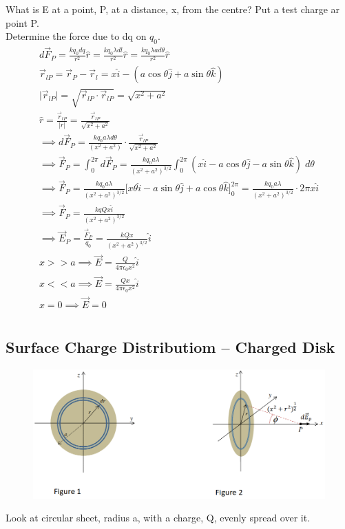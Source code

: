 \documentclass[a4paper, 11pt, fleqn, normalem]{report}
\begin{document}
What is E at a point, P, at a distance, x, from the centre?
Put a test charge ar point P. \\
Determine the force due to dq on $q_{0}$.
\begin{gather*}
    d\vec{F}_{P} = \frac{kq_{0}dq}{r^{2}} \hat{r} = \frac{kq_{0}\lambda dl}{r^{2}} \hat{r} = \frac{kq_{0}\lambda a d\theta}{r^{2}} \hat{r} \\
    \vec{r}_{lP} = \vec{r}_{P} - \vec{r}_{l} = x \hat{i} - (a\cos\theta \hat{j} + a\sin\theta \hat{k}) \\
    \big|\vec{r}_{lP}\big| = \sqrt{\vec{r}_{lP} \cdot \vec{r}_{lP}} = \sqrt{x^{2} + a^{2}} \\
    \hat{r} = \frac{\vec{r}_{lP}}{|r|} = \frac{\vec{r}_{lP}}{\sqrt{x^{2} + a^{2}}} \\
    \implies d\vec{F}_{P} = \frac{k q_{0} a \lambda d\theta}{(x^{2} + a^{2})} \cdot \frac{\vec{r}_{lP}}{\sqrt{x^{2} + a^{2}}} \\
    \implies \vec{F}_{P} = \int_{0}^{2\pi} d\vec{F}_{P} = \frac{k q_{0} a \lambda}{(x^{2} + a^{2})^{3/2}} \int_{0}^{2\pi} (x \hat{i} - a\cos\theta \hat{j} - a\sin\theta \hat{k}) \; d\theta \\
    \implies \vec{F}_{P} = \frac{k q_{0} a \lambda}{(x^{2} + a^{2})^{3/2}} \big[x\theta \hat{i} - a\sin\theta \hat{j} + a\cos\theta \hat{k} \big]_{0}^{2\pi} = \frac{k q_{0} a \lambda}{(x^{2} + a^{2})^{3/2}} \cdot 2\pi x \hat{i} \\
    \implies \vec{F}_{P} = \frac{k q Q x \hat{i}}{(x^{2} + a^{2})^{3/2}} \\
    \implies \vec{E}_{P} = \frac{\vec{F}_{P}}{q_{0}} = \frac{k Q x}{(x^{2} + a^{2})^{3/2}} \hat{i} \\
    x >> a \implies \vec{E} = \frac{Q}{4\pi\epsilon_{0}x^{2}} \hat{i} \\
    x << a \implies \vec{E} = \frac{Q x}{4\pi\epsilon_{0}x^{2}} \hat{i} \\
    x = 0 \implies \vec{E} = 0
\end{gather*}

\chapter{}
\section{Surface Charge Distributiom -- Charged Disk}
\begin{figure}[H]
    \includegraphics[scale=0.4]{R1.png}
\end{figure}
Look at circular sheet, radius a, with a charge, Q, evenly spread over it.
\end{document}
